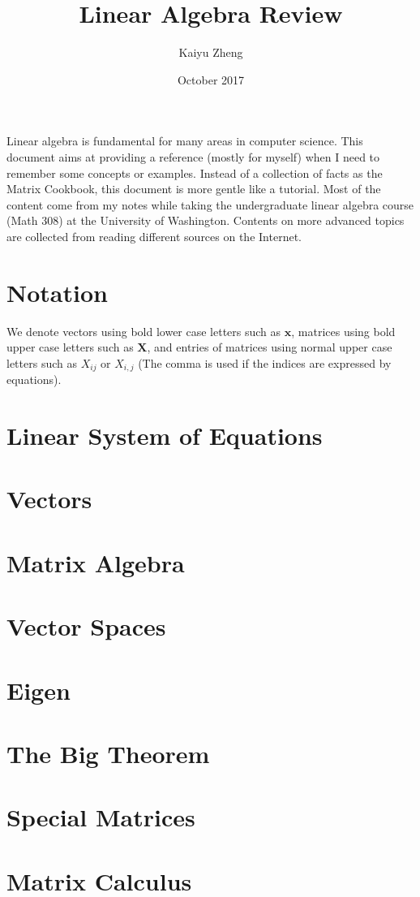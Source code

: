 \documentclass[11pt]{article}
\title{Linear Algebra Review}
\author{Kaiyu Zheng}
\date{October 2017}
\theoremstyle{definition}
\begin{document}
\maketitle

\noindent Linear algebra is fundamental for many areas in computer science. This document aims at providing a reference (mostly for myself) when I need to remember some concepts or examples. Instead of a collection of facts as the Matrix Cookbook, this document is more gentle like a tutorial. Most of the content come from my notes while taking the undergraduate linear algebra course (Math 308) at the University of Washington. Contents on more advanced topics are collected from reading different sources on the Internet.

\begin{multicols}{2}
\setlength{\columnseprule}{0.4pt}
  \tableofcontents
\end{multicols}

\section*{Notation}
We denote vectors using bold lower case letters such as $\bm{x}$, matrices using bold upper case letters such as $\bm{X}$, and entries of matrices using normal upper case letters such as $X_{ij}$ or $X_{i,j}$ (The comma is used if the indices are expressed by equations).  

\section{Linear System of Equations}
\label{sec:linsys}


\section{Vectors}
\label{sec:vectors}


\section{Matrix Algebra}
\label{sec:malg}


\section{Vector Spaces}
\label{sec:vecspace}



\section{Eigen}
\label{sec:eigen}



\section{The Big Theorem}
\label{sec:bigt}


\section{Special Matrices}
\label{sec:special}


\section{Matrix Calculus}
\label{sec:mcalc}

\end{document}

